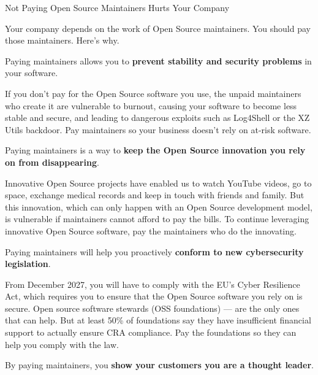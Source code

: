 \begin{multicols}{2}
\vspace{3mm}
{\renewcommand{\baselinestretch}{0.9}\Huge\raggedright Not Paying Open Source Maintainers Hurts Your Company\par}

Your company depends on the work of Open Source maintainers. You should pay those maintainers. Here's why.

\vspace{3mm}

 Paying maintainers allows you to \textbf{prevent stability and security problems} in your software.

If you don't pay for the Open Source software you use, the unpaid maintainers who create it are vulnerable to burnout,
causing your software to become less stable and secure, and leading to dangerous exploits such as Log4Shell or the XZ Utils
backdoor. Pay maintainers so your business doesn't rely on at-risk software.

\vspace{3mm}

 Paying maintainers is a way to \textbf{keep the Open Source innovation you rely on from
disappearing}.

Innovative Open Source projects have enabled us to watch YouTube videos, go to space, exchange medical records and keep
in touch with friends and family. But this innovation, which can only happen with an Open Source development model, is
vulnerable if maintainers cannot afford to pay the bills. To continue leveraging innovative Open Source software, pay
the maintainers who do the innovating.

\vspace{3mm}

 Paying maintainers will help you proactively \textbf{conform to new cybersecurity legislation}.

From December 2027, you will have to comply with the EU's Cyber Resilience Act, which requires you to ensure that the
Open Source software you rely on is secure. Open source software stewards (OSS foundations) — are the only ones that
can help. But at least 50\% of foundations say they have insufficient financial support to actually ensure CRA
compliance. Pay the foundations so they can help you comply with the law.

\vspace{3mm}

 By paying maintainers, you \textbf{show your customers you are a thought leader}.


\end{multicols}
